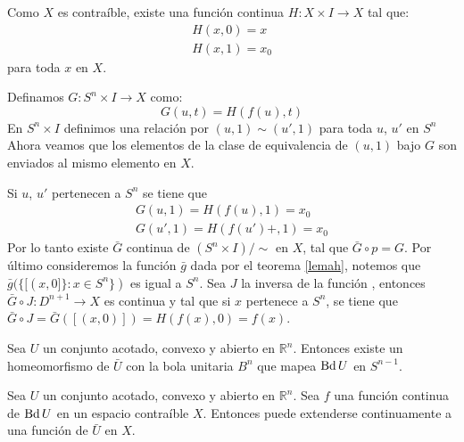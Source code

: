 \begin{Dem}

Como $X$ es contraíble, existe una función continua $H\colon X\times I \rightarrow X$ tal que:
\begin{eqnarray}
H(x,0)=x \\
H(x,1) = x_0
\end{eqnarray}
para toda $x$ en $X$.

Definamos $G\colon S^n\times I \rightarrow X$ como:
\begin{equation}
G(u,t) = H(f(u),t)
\end{equation}
En $S^n\times I$ definimos una relación por $(u,1)\sim(u',1)$ para toda $u$, $u'$ en $S^n$
Ahora veamos que los elementos de la clase de equivalencia de $(u,1)$ bajo $G$ son enviados al mismo elemento en $X$.

Si $u$, $u'$ pertenecen a $S^n$ se tiene que
\begin{eqnarray}
G(u,1) = H(f(u),1) = x_0\\
G(u',1)=H(f(u')+,1) = x_0
\end{eqnarray}
Por lo tanto existe $\bar{G}$ continua de $(S^n\times I) /{\sim}$ en $X$, tal que $\bar{G}\circ p = G$.
Por último consideremos la función $\bar{g}$ dada por el teorema \ref{lemah}, notemos que $\bar{g}(\{[(x,0]\}\colon x\in S^n\})$ es igual a $S^n$. Sea $J$ la inversa de la función  , entonces $\bar{G}\circ J \colon D^{n+1}\rightarrow X$ es continua y tal que si $x$ pertenece a $S^n$, se tiene que $\bar{G}\circ J = \bar{G}([(x,0)])= H(f(x),0) = f(x)$.
\end{Dem}

\begin{Teo}\label{homeo_esfera}
Sea $U$ un conjunto acotado, convexo y abierto en $\mathbb{R}^n$. Entonces existe un homeomorfismo de $\bar{U}$ con la bola unitaria $B^n$ que mapea  $\operatorname{Bd} U$ en $S^{n-1}$.
\end{Teo}

\begin{Col}\label{ext_general}
Sea $U$ un conjunto acotado, convexo y abierto en $\mathbb{R}^n$. Sea $f$ una función continua de $\operatorname{Bd} U$ en un espacio contraíble $X$. Entonces  puede extenderse continuamente a una función de $\bar{U}$ en $X$.
\end{Col}

